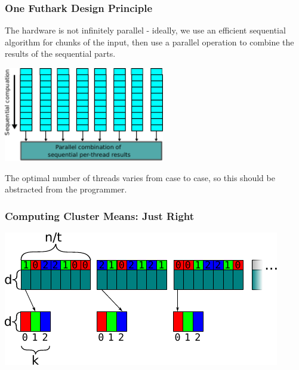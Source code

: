 \documentclass[rgb,dvipsnames]{beamer}
\begin{document}
\begin{frame}
  \frametitle{One Futhark Design Principle}

  \begin{block}{}
    The hardware is not infinitely parallel - ideally, we use an
    efficient sequential algorithm for chunks of the input, then use a
    parallel operation to combine the results of the sequential parts.
  \end{block}

  \begin{center}
    \includegraphics[width=7cm]{img/chunking.pdf}
  \end{center}

  The optimal number of threads varies from case to case, so this
  should be abstracted from the programmer.
\end{frame}

\begin{frame}[fragile]
  \frametitle{Computing Cluster Means: Just Right}

  \begin{center}
\includegraphics[width=\textwidth]{img/cluster_means_chunked_0.pdf}
\end{center}
\end{frame}
\end{document}
